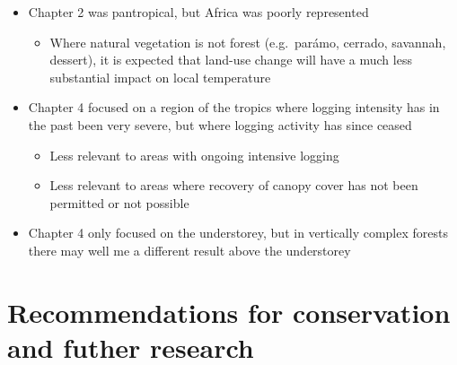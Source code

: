 \documentclass[12pt,a4paper,]{report}
\providecommand{\tightlist}{%
  \setlength{\itemsep}{0pt}\setlength{\parskip}{0pt}}
\theoremstyle{definition}
\theoremstyle{definition}
\theoremstyle{definition}
\theoremstyle{remark}
\begin{document}
\begin{itemize}
\tightlist
\item
  Chapter 2 was pantropical, but Africa was poorly represented

  \begin{itemize}
  \tightlist
  \item
    Where natural vegetation is not forest (e.g.~parámo, cerrado,
    savannah, dessert), it is expected that land-use change will have a
    much less substantial impact on local temperature
  \end{itemize}
\item
  Chapter 4 focused on a region of the tropics where logging intensity
  has in the past been very severe, but where logging activity has since
  ceased

  \begin{itemize}
  \tightlist
  \item
    Less relevant to areas with ongoing intensive logging
  \item
    Less relevant to areas where recovery of canopy cover has not been
    permitted or not possible
  \end{itemize}
\item
  Chapter 4 only focused on the understorey, but in vertically complex
  forests there may well me a different result above the understorey
\end{itemize}

\section{Recommendations for conservation and futher
research}\label{recommendations-for-conservation-and-futher-research}
\end{document}
